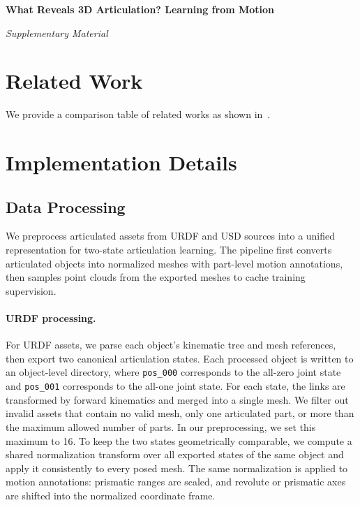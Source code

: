\clearpage

\begin{center}
    {\Large\textbf{What Reveals 3D Articulation? Learning from Motion}}

    \vspace{0.1in}
    {{\textit{Supplementary Material}}}

    \vspace{0.1in}

\end{center}

\section{Related Work}
\label{sec:supp_related_work}


We provide a comparison table of related works as shown in~.


\section{Implementation Details}
\label{sec:supp_details}

\subsection{Data Processing}
\label{sec:supp_data_processing}

We preprocess articulated assets from URDF and USD sources into a unified representation for two-state articulation learning. The pipeline first converts articulated objects into normalized meshes with part-level motion annotations, then samples point clouds from the exported meshes to cache training supervision.

\paragraph{URDF processing.}
For URDF assets, we parse each object's kinematic tree and mesh references, then export two canonical articulation states. Each processed object is written to an object-level directory, where \texttt{pos\_000} corresponds to the all-zero joint state and \texttt{pos\_001} corresponds to the all-one joint state. For each state, the links are transformed by forward kinematics and merged into a single mesh. We filter out invalid assets that contain no valid mesh, only one articulated part, or more than the maximum allowed number of parts. In our preprocessing, we set this maximum to 16.
% 
To keep the two states geometrically comparable, we compute a shared normalization transform over all exported states of the same object and apply it consistently to every posed mesh. The same normalization is applied to motion annotations: prismatic ranges are scaled, and revolute or prismatic axes are shifted into the normalized coordinate frame.

